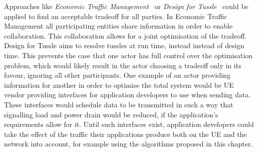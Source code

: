 Approaches like \emph{Economic Traffic Management}~\cite{spirou2009} or \emph{Design for Tussle}~\cite{trilogy2008} could be applied to find
an acceptable tradeoff for all parties.
In Economic Traffic Management all participating entities share information in order to enable collaboration.
This collaboration allows for a joint optimisation of the tradeoff.
Design for Tussle aims to resolve tussles at run time, instead instead of design time.
This prevents the case that one actor has full control over the optimisation problem, which would likely result in the actor choosing a tradeoff only in its favour, ignoring all other participants.
One example of an actor providing information for another in order to optimise the total system would be \gls{UE} vendor providing interfaces for application developers to use when sending data.
These interfaces would schedule data to be transmitted in such a way that signalling load and power drain would be reduced, if the application’s requirements allow for it.
Until such interfaces exist, application developers could take the effect of the traffic their applications
produce both on the \gls{UE} and the network into account, for example using the algorithms proposed in this chapter. 